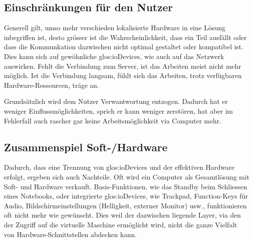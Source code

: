 \subsection{Einschränkungen für den Nutzer}
Generell gilt, umso mehr verschieden lokalisierte Hardware in eine Lösung inbegriffen ist, desto grösser ist die Wahrscheinlichkeit, dass ein Teil ausfällt oder dass die Kommunkation dazwischen nicht optimal gestaltet oder kompatibel ist.
Dies kann sich auf gewöhnliche \glspl{glos:ioDevice}, wie auch auf das Netzwerk auswirken.
Fehlt die Verbindung zum Server, ist das Arbeiten meist nicht mehr möglich.
Ist die Verbindung langsam, fühlt sich das Arbeiten, trotz verfügbaren Hardware-Ressourcen, träge an.

Grundsätzlich wird dem Nutzer Verwantwortung entzogen. Dadurch hat er weniger Einflussmöglichkeiten, sprich er kann weniger zerstören, hat aber im Fehlerfall auch rascher gar keine Arbeitsmöglichkeit via Computer mehr.

\subsection{Zusammenspiel Soft-/Hardware}
Dadurch, dass eine Trennung von \glspl{glos:ioDevice} und der effektiven Hardware erfolgt, ergeben sich auch Nachteile.
Oft wird ein Computer als Gesamtlösung mit Soft- und Hardware verkauft.
Basis-Funktionen, wie das Standby beim Schliessen eines Notebooks, oder integrierte \glspl{glos:ioDevice}, wie Trackpad, Function-Keys für Audio, Bildschirmeinstellungen (Helligkeit, externer Monitor) usw., funktionieren oft nicht mehr wie gewünscht.
Dies weil der dazwischen liegende Layer, via den der Zugriff auf die virtuelle Maschine ermöglicht wird,  nicht die ganze Vielfalt von Hardware-Schnittstellen abdecken kann.



